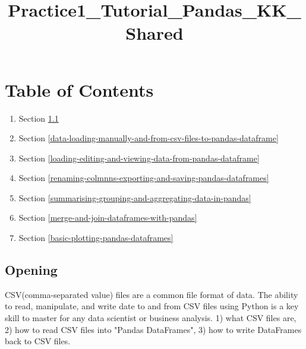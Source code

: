\documentclass[11pt]{article}
\title{Practice1\_Tutorial\_Pandas\_KK\_Shared}
\providecommand{\tightlist}{%
      \setlength{\itemsep}{0pt}\setlength{\parskip}{0pt}}
\begin{document}
    
    
    \maketitle
    
    

    
    \section{Table of Contents}\label{table-of-contents}

\begin{enumerate}
\def\labelenumi{\arabic{enumi}.}
\tightlist
\item
  Section \ref{opening}
\item
  Section \ref{data-loading-manually-and-from-csv-files-to-pandas-dataframe}
\item
  Section \ref{loading-editing-and-viewing-data-from-pandas-dataframe}
\item
  Section \ref{renaming-colmnns-exporting-and-saving-pandas-dataframes}
\item
  Section \ref{summarising-grouping-and-aggregating-data-in-pandas}
\item
  Section \ref{merge-and-join-dataframes-with-pandas}
\item
  Section \ref{basic-plotting-pandas-dataframes}
\end{enumerate}

    \subsection{Opening}\label{opening}

CSV(comma-separated value) files are a common file format of data. The
ability to read, manipulate, and write date to and from CSV files using
Python is a key skill to master for any data scientist or business
analysis. 1) what CSV files are, 2) how to read CSV files into "Pandas
DataFrames", 3) how to write DataFrames back to CSV files.
\end{document}
